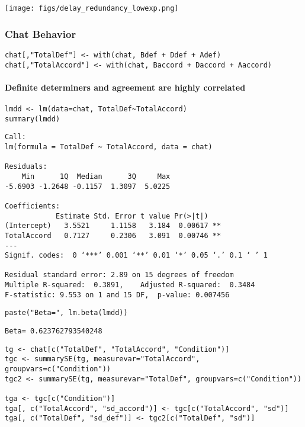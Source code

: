 \documentclass[10pt]{article}
\begin{document}
\texttt{[image: figs/delay\_redundancy\_lowexp.png]}


\subsubsection{Chat Behavior}
\label{sec-2-4-3}

\begin{verbatim}
chat[,"TotalDef"] <- with(chat, Bdef + Ddef + Adef)
chat[,"TotalAccord"] <- with(chat, Baccord + Daccord + Aaccord)
\end{verbatim}


\paragraph*{Definite determiners and agreement are highly correlated}
\label{sec-2-4-3-1}

\begin{verbatim}
lmdd <- lm(data=chat, TotalDef~TotalAccord)
summary(lmdd)
\end{verbatim}

\begin{verbatim}
Call:
lm(formula = TotalDef ~ TotalAccord, data = chat)

Residuals:
    Min      1Q  Median      3Q     Max 
-5.6903 -1.2648 -0.1157  1.3097  5.0225 

Coefficients:
            Estimate Std. Error t value Pr(>|t|)   
(Intercept)   3.5521     1.1158   3.184  0.00617 **
TotalAccord   0.7127     0.2306   3.091  0.00746 **
---
Signif. codes:  0 ‘***’ 0.001 ‘**’ 0.01 ‘*’ 0.05 ‘.’ 0.1 ‘ ’ 1

Residual standard error: 2.89 on 15 degrees of freedom
Multiple R-squared:  0.3891,	Adjusted R-squared:  0.3484 
F-statistic: 9.553 on 1 and 15 DF,  p-value: 0.007456
\end{verbatim}


\begin{verbatim}
paste("Beta=", lm.beta(lmdd))
\end{verbatim}

\begin{verbatim}
Beta= 0.623762793540248
\end{verbatim}


\begin{verbatim}
tg <- chat[c("TotalDef", "TotalAccord", "Condition")]
tgc <- summarySE(tg, measurevar="TotalAccord", groupvars=c("Condition"))
tgc2 <- summarySE(tg, measurevar="TotalDef", groupvars=c("Condition"))

tga <- tgc[c("Condition")]
tga[, c("TotalAccord", "sd_accord")] <- tgc[c("TotalAccord", "sd")]
tga[, c("TotalDef", "sd_def")] <- tgc2[c("TotalDef", "sd")]
\end{verbatim}
\end{document}
